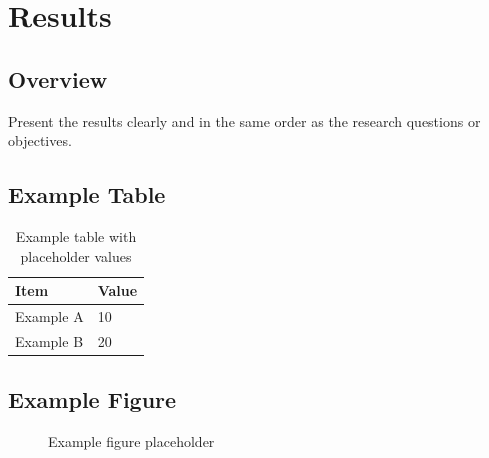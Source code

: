 \chapter{Results}
\label{ch:results}

\section{Overview}
\label{sec:results-overview}

Present the results clearly and in the same order as the research questions or
objectives.

\section{Example Table}
\label{sec:example-table}

\begin{table}[H]
\centering
\caption{Example table with placeholder values}
\label{tab:example}
\begin{tabular}{ll}
\toprule
Item & Value \\
\midrule
Example A & 10 \\
Example B & 20 \\
\bottomrule
\end{tabular}
\end{table}

\section{Example Figure}
\label{sec:example-figure}

\begin{figure}[H]
\centering
\fbox{\rule{0pt}{1.2in}\rule{4in}{0pt}}
\caption{Example figure placeholder}
\label{fig:example}
\end{figure}
